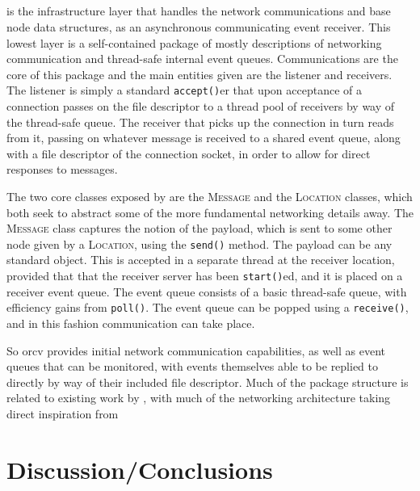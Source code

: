 \documentclass[letterpaper, inpress]{jds} %
\begin{document}
\subsection{}

\subsection{}

 is the infrastructure layer that handles the network communications and base node data structures, as an asynchronous communicating event receiver.
This lowest layer is a self-contained package of mostly  descriptions of networking communication and thread-safe internal event queues.
Communications are the core of this package and the main entities given are the listener and receivers.
The listener is simply a standard \lstinline{accept()}er that upon acceptance of a connection passes on the file descriptor to a thread pool of receivers by way of the thread-safe queue.
The receiver that picks up the connection in turn reads from it, passing on whatever message is received to a shared event queue, along with a file descriptor of the connection socket, in order to allow for direct responses to messages.

The two core classes exposed by  are the \textsc{Message} and the \textsc{Location} classes, which both seek to abstract some of the more fundamental networking details away.
The \textsc{Message} class captures the notion of the payload, which is sent to some other node given by a \textsc{Location}, using the \lstinline{send()} method.
The payload can be any standard  object.
This is accepted in a separate thread at the receiver location, provided that that the receiver server has been \lstinline{start()}ed, and it is placed on a receiver event queue.
The event queue consists of a basic thread-safe queue, with efficiency gains from \lstinline{poll()}.
The event queue can be popped using a \lstinline{receive()}, and in this fashion communication can take place.

So orcv provides initial network communication capabilities, as well as event queues that can be monitored, with events themselves able to be replied to directly by way of their included file descriptor.
Much of the package structure is related to existing work by \citet{osrv}, with much of the networking architecture taking direct inspiration from \citet{stevens1997network}

\section{Discussion/Conclusions}
\end{document}

